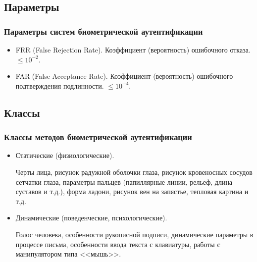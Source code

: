 \subsection{Параметры}

\begin{frame}
\frametitle{Параметры систем биометрической аутентификации}
\begin{itemize}

    \item FRR (False Rejection Rate). Коэффициент (вероятность) ошибочного отказа. $\leq 10^{-2}$.
    
    \item FAR (False Acceptance Rate). Коэффициент (вероятность) ошибочного подтверждения подлинности. $\leq 10^{-4}$.
    
\end{itemize}
\end{frame}


\subsection{Классы}

\begin{frame}
\frametitle{Классы методов биометрической аутентификации}
\begin{itemize}
    \item Статические (физиологические).
    
    Черты лица, рисунок радужной оболочки глаза, рисунок кровеносных сосудов сетчатки глаза, параметры пальцев (папиллярные линии, рельеф, длина суставов и т.д.), форма ладони, рисунок вен на запястье, тепловая картина и т.д. 
    
    \item Динамические (поведенческие, психологические).
    
    Голос человека, особенности рукописной подписи, динамические параметры в процессе письма, особенности ввода текста с клавиатуры, работы с манипулятором типа <<мышь>>.
    
\end{itemize}
\end{frame}


